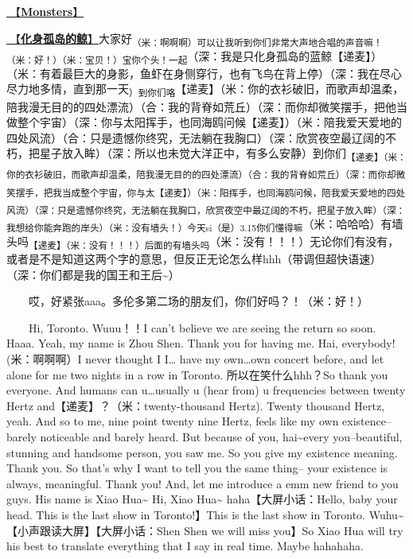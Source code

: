 \documentclass[]{ctexbook}
\begin{document}
\hyperref[Monsters]{🎵【\textbf{Monsters}】}

\hyperref[hua-shen-gu-dao-de-jing]{🎵【\textbf{化身孤岛的鲸}】}大家好\textsubscript{（米：啊啊啊）可以让我听到你们非常大声地合唱的声音嘛！（米：好！）（米：宝贝！）宝你个头！一起}（深：我是只化身孤岛的蓝鲸【递麦】）（米：有着最巨大的身影，鱼虾在身侧穿行，也有飞鸟在背上停）（深：我在尽心尽力地多情，直到那一天\textsubscript{）到你们咯}【递麦】（米：你的衣衫破旧，而歌声却温柔，陪我漫无目的的四处漂流）（合：我的背脊如荒丘）（深：而你却微笑摆手，把他当做整个宇宙）（深：你与太阳挥手，也同海鸥问候【递麦】）（米：陪我爱天爱地的四处风流）（合：只是遗憾你终究，无法躺在我胸口）（深：欣赏夜空最辽阔的不朽，把星子放入眸）（深：所以也未觉大洋正中，有多么安静）到你们\textsubscript{【递麦】（米：你的衣衫破旧，而歌声却温柔，陪我漫无目的的四处漂流）（合：我的背脊如荒丘）（深：而你却微笑摆手，把我当成整个宇宙，你与太【递麦】）（米：阳挥手，也同海鸥问候，陪我爱天爱地的四处风流）（深：只是遗憾你终究，无法躺在我胸口，欣赏夜空中最辽阔的不朽，把星子放入眸）（深：我想给你能奔跑的岸头）（米：没有墙头！）今天si（是）3.15你们懂得嘛}（米：哈哈哈）有墙头吗\textsubscript{【递麦】（米：没有！！！）后面的有墙头吗}（米：没有！！！）无论你们有没有，或者是不是知道这两个字的意思，但反正无论怎么样hhh（带调但超快语速）（深：你们都是我的国王和王后\textasciitilde）

  哎，好紧张aaa。多伦多第二场的朋友们，你们好吗？！（米：好！）

  Hi, Toronto. Wuuu！！I can't believe we are seeing the return so soon. Haaa. Yeah, my name is Zhou Shen. Thank you for having me. Hai, everybody!(米：啊啊啊）I never thought I I\ldots{} have my own\ldots own concert before, and let alone for me two nights in a row in Toronto. 所以在笑什么hhh？So thank you everyone. And humans can u\ldots usually u (hear from) u frequencies between twenty Hertz and【递麦】？（米：twenty-thousand Hertz). Twenty thousand Hertz, yeah. And so to me, nine point twenty nine Hertz, feels like my own existence--barely noticeable and barely heard. But because of you, hai\textasciitilde every you--beautiful, stunning and handsome person, you saw me. So you give my existence meaning. Thank you. So that's why I want to tell you the same thing-- your existence is always, meaningful. Thank you! And, let me introduce a emm new friend to you guys. His name is Xiao Hua\textasciitilde{} Hi, Xiao Hua\textasciitilde{} haha【大屏小话：Hello, baby your head. This is the last show in Toronto!】This is the last show in Toronto. Wuhu\textasciitilde【小声跟读大屏】【大屏小话：Shen Shen we will miss you】So Xiao Hua will try his best to translate everything that I say in real time. Maybe hahahaha.
\end{document}
